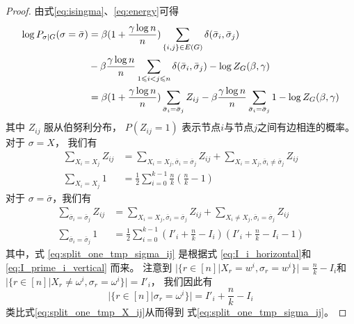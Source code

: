 \begin{proof}
  由式\eqref{eq:isingma}、\eqref{eq:energy}可得
	\begin{align}
  \log P_{\sigma|G}(\sigma=\bar{\sigma})
  & = 
  \beta(1 + \frac{\gamma \log n}{n}) \sum_{\{i,j\} \in E(G)}  \delta(\bar{\sigma}_i, \bar{\sigma}_j)  
	\notag\\
  &\quad- \beta\frac{\gamma \log n}{n} \sum_{1\leq i<j \leq n} \delta(\bar{\sigma}_i, \bar{\sigma}_j) 
  - \log Z_G(\beta, \gamma) \notag\\
  & = 
  \beta(1 + \frac{\gamma \log n}{n}) \sum_{\bar{\sigma}_i = \bar{\sigma}_j} Z_{ij}
	- \beta\frac{\gamma \log n}{n}
  \sum_{\bar{\sigma}_i = \bar{\sigma}_j} 1 
  - \log Z_G(\beta, \gamma)
  \label{eq:log_P_sigma_G_bar_sigma}
  \end{align}
	其中 $Z_{ij}$ 服从伯努利分布，
  $P(Z_{ij}=1)$ 表示节点$i$与节点$j$之间有边相连的概率。
	对于 $\sigma = X$， 我们有
	\begin{align}
	\sum_{X_i = X_j} Z_{ij} &
  = \sum_{X_i = X_j, \bar{\sigma}_i = \bar{\sigma}_j}
  Z_{ij} + \sum_{X_i = X_j, \bar{\sigma}_i \neq \bar{\sigma}_j}
  Z_{ij}
  \label{eq:split_zij_tmp_X_ij}\\
	\sum_{X_i = X_j} 1 &= \frac{1}{2} \sum_{i=0}^{k-1} \frac{n}{k} 
  \left( \frac{n}{k} - 1 
  \right)\label{eq:split_one_tmp_X_ij}
	\end{align}
	对于 $\sigma = \bar{\sigma}$，我们有
	\begin{align}
	\sum_{\bar{\sigma}_i = \bar{\sigma}_j} Z_{ij} &= \sum_{X_i = X_j, \bar{\sigma}_i = \bar{\sigma}_j} Z_{ij} + \sum_{X_i \neq X_j, \bar{\sigma}_i = \bar{\sigma}_j} Z_{ij} 
  \label{eq:split_zij_tmp_sigma_ij}\\
	\sum_{\bar{\sigma}_i = \bar{\sigma}_j} 1 &= \frac{1}{2} \sum_{i=0}^{k-1} 
  \left(I'_i + \frac{n}{k} - I_i \right)
  \left( I'_i + \frac{n}{k} - I_i - 1 \right)
  \label{eq:split_one_tmp_sigma_ij}
	\end{align}
  其中，式 \eqref{eq:split_one_tmp_sigma_ij} 是根据式
  \eqref{eq:I_i_horizontal}和 \eqref{eq:I_prime_i_vertical}
  而来。
	注意到
  $
  \Big|\{r\in [n] \big| X_r = w^i, \sigma_r=w^i \}\Big|
  =\frac{n}{k} - I_i$和
	$|\{r\in [n] | X_r \neq \omega^i, \sigma_r = \omega^i \}| = I'_i$，
	我们因此有  
  \begin{equation}\label{eq:number_of_sigma_r_equal_omega_i}
    |\{r\in [n] | \sigma_r = \omega^i \}|
    = I'_i + \frac{n}{k} - I_i
  \end{equation}
  类比式\eqref{eq:split_one_tmp_X_ij}从而得到
  式\eqref{eq:split_one_tmp_sigma_ij}。


\end{proof}
